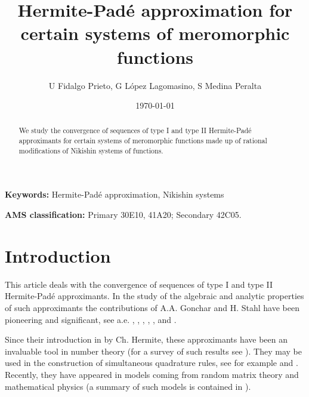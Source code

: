 \documentclass[10pt,a4paper]{article}
\title{Hermite-Pad\'e approximation for certain systems of meromorphic functions}
\date{\today}
\author{U Fidalgo Prieto\footnotemark[1], G L\'opez Lagomasino\footnotemark[2], S Medina Peralta\footnotemark[2]}
\theoremstyle{definition}
\theoremstyle{remark}
\numberwithin{equation}{section}
\begin{document}
\maketitle

\renewcommand{\thefootnote}{\fnsymbol{footnote}}

\begin{abstract}
We study the convergence of sequences of type I and type II Hermite-Pad\'e approximants for certain  systems of meromorphic functions made up of  rational modifications of Nikishin systems of functions.
\end{abstract}

\textbf{Keywords:} Hermite-Pad\'e approximation, Nikishin systems

\textbf{AMS classification:} Primary 30E10, 41A20; Secondary 42C05.

\maketitle

\section{Introduction}

This article deals with the convergence of sequences of type I and type II Hermite-Pad\'e approximants. In the study of the algebraic and analytic properties of such approximants the contributions of A.A. Gonchar and H. Stahl have been pioneering and significant, see a.e.  \cite{DrSt0}, \cite{DrSt1}, \cite{DrSt2}, \cite{GR},   \cite{GRS}, and \cite{Stahl}.

Since their introduction in \cite{Her} by Ch. Hermite, these approximants have been an invaluable tool in number theory (for a survey of such results see \cite{walter}). They may be used in the construction of simultaneous quadrature rules, see for example \cite{cou}  and \cite{LIF2}. Recently, they have appeared in models coming from random matrix theory and mathematical physics  (a summary of such models is contained in \cite{Kuij}).
\end{document}
